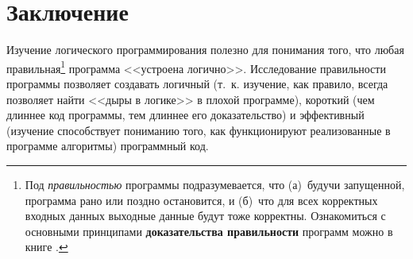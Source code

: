 \documentclass[12pt, openany, twoside]{book} %
\begin{document}

\chapter*{Заключение}


Изучение логического программирования полезно для понимания того, что любая правильная\footnote{Под {\em правильностью} программы подразумевается, что (а)~будучи запущенной, программа рано или поздно остановится, и (б)~что для всех корректных входных данных выходные данные будут тоже корректны. Ознакомиться с основными принципами {\bf доказательства правильности} программ можно в книге \cite{Anderson}.} программа <<устроена логично>>. Исследование правильности программы позволяет создавать логичный (т.~к. изучение, как правило, всегда позволяет найти <<дыры в логике>> в плохой программе), короткий (чем длиннее код программы, тем длиннее его доказательство) и эффективный (изучение способствует пониманию того, как  функционируют реализованные в программе алгоритмы) программный код.
\end{document}
